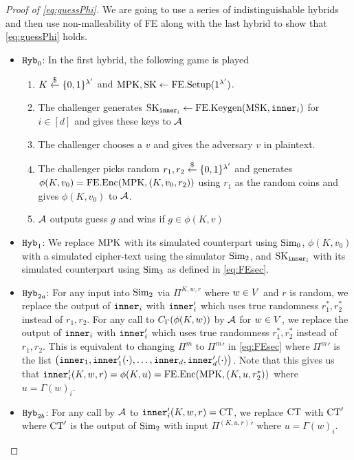 \begin{proof}[Proof of \cref{eq:guessPhi}]
	We are going to use a series of indistinguishable hybrids and then use non-malleability of FE
	along with the last hybrid to show that \cref{eq:guessPhi} holds.
	\begin{itemize}
		\item $\texttt{Hyb}_0$: In the first hybrid, the following game is played
			\begin{enumerate}
				\item $K \overset{\$}{\gets} \{0,1\}^{\lambda'}$ and $\text{MPK}, \text{SK} \gets \text{FE.Setup}(1^{\lambda'})$.
				\item The challenger generates $\text{SK}_{\texttt{inner}_i} \gets \text{FE.Keygen}(\text{MSK}, \texttt{inner}_i)$ for $i \in [d]$ and gives these keys to $\mathcal{A}$
				\item The challenger chooses a $v$ and gives the adversary $v$ in plaintext.
				\item The challenger picks random $r_1, r_2 \overset{\$}{\gets} \{0,1\}^{\lambda'}$ and generates $\phi(K, v_0) = \text{FE.Enc}(\text{MPK}, (K, v_0, r_2))$ using $r_1$ as the random coins and gives $\phi(K, v_0)$ to $\mathcal{A}$.
				\item $\mathcal{A}$ outputs guess $g$ and wins if $g \in \phi(K, v)$
			\end{enumerate}
		\item $\texttt{Hyb}_1$: We replace $\text{MPK}$ with its simulated counterpart using $\text{Sim}_0$,
		$\phi(K, v_0)$ with a simulated cipher-text using the simulator $\text{Sim}_2$,
		and $\text{SK}_{\texttt{inner}_i}$ with its simulated counterpart using $\text{Sim}_3$ as defined in \cref{eq:FEsec}.

		\item $\texttt{Hyb}_{2a}$: For any input into $\text{Sim}_2$ via $\Pi^{K, w, r}$ where $w \in V$
		and $r$ is random, we replace the output of $\texttt{inner}_i$ with $\texttt{inner}_i'$ which uses true randomness $r_1^*, r_2^*$ instead of $r_1, r_2$.
		For any call to $C_\Gamma(\phi(K, w))$ by $\mathcal{A}$ for $w \in V$,
		we replace the output of $\texttt{inner}_i$ with $\texttt{inner}_i'$ which uses true randomness $r_1^*, r_2^*$ instead of $r_1, r_2$.
		This is equivalent to changing $\Pi^m$ to ${\Pi^m}'$ in \cref{eq:FEsec} where ${\Pi^{m}}'$ is 
		the list $\big(\texttt{inner}_1, \texttt{inner}_1'(\cdot), \dots, \texttt{inner}_d, \texttt{inner}_d'(\cdot)\big)$.
		Note that this gives us that $\texttt{inner}_i'(K, w, r) = \phi(K, u) = \text{FE.Enc}(\text{MPK}, (K, u, r^*_2))$ where $u = \Gamma(w)_i$.

		\item $\texttt{Hyb}_{2b}$: For any call by $\mathcal{A}$ to $\texttt{inner}_i'(K, w, r) = \text{CT}$, we replace $\text{CT}$
		with $\text{CT}'$ where $\text{CT}'$ is the output of $\text{Sim}_2$ with input ${\Pi^{(K, u, r)}}'$ where $u = \Gamma(w)_i$.


\end{itemize}
\end{proof}
